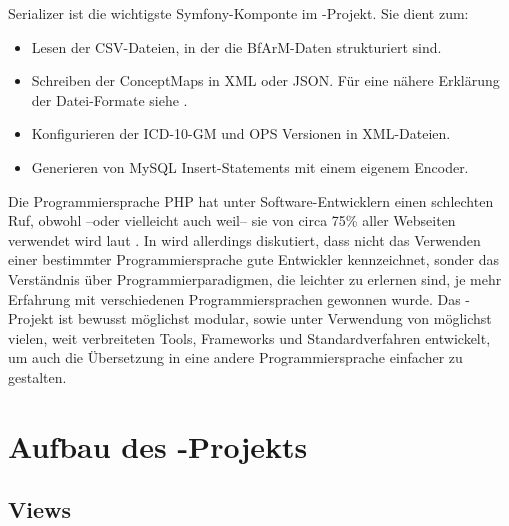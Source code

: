\vspace{-1.1em}

Serializer ist die wichtigste Symfony-Komponte im \bfarmer-Projekt. Sie dient zum: 

\begin{itemize}
\item Lesen der CSV-Dateien, in der die BfArM-Daten strukturiert sind.
\item Schreiben der ConceptMaps in XML oder JSON. Für eine nähere Erklärung der Datei-Formate siehe \cite[Seite 133ff]{bonnefoy2024definitive}.
\item Konfigurieren der ICD-10-GM und OPS Versionen in XML-Dateien.
\item Generieren von MySQL Insert-Statements mit einem eigenem Encoder.
\end{itemize}


Die Programmiersprache PHP hat unter Software-Entwicklern einen schlechten Ruf, obwohl --oder vielleicht auch weil-- sie von circa 75\% aller Webseiten verwendet wird laut \cite{w3techs}. In \cite{janssenscan} wird allerdings diskutiert, dass nicht das Verwenden einer bestimmter Programmiersprache gute Entwickler kennzeichnet, sonder das Verständnis über Programmierparadigmen, die leichter zu erlernen sind, je mehr Erfahrung mit verschiedenen Programmiersprachen gewonnen wurde. Das \bfarmer-Projekt ist bewusst möglichst modular, sowie unter Verwendung von möglichst vielen, weit verbreiteten Tools, Frameworks und Standardverfahren entwickelt, um auch die Übersetzung in eine andere Programmiersprache einfacher zu gestalten. 

\newpage

\section{Aufbau des \bfarmer-Projekts}

\subsection{Views}

